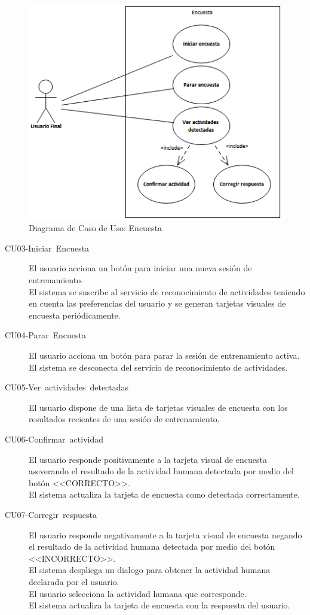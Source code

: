 \begin{figure}[H]
\begin{centering}
\includegraphics{capitulo-5/graphics/caso_encuesta}
\par\end{centering}
\caption[Diagrama de Caso de Uso: Encuesta]{\label{fig5:uc-encuesta}Diagrama de Caso de Uso: Encuesta}

\end{figure}

\begin{description}
\item [{CU03-Iniciar~Encuesta}] El usuario acciona un botón para iniciar
una nueva sesión de entrenamiento. \\
El sistema se suscribe al servicio de reconocimiento de actividades
teniendo en cuenta las preferencias del usuario y se generan tarjetas
visuales de encuesta periódicamente.
\item [{CU04-Parar~Encuesta}] El usuario acciona un botón para parar la
sesión de entrenamiento activa. \\
El sistema se desconecta del servicio de reconocimiento de actividades.
\item [{CU05-Ver~actividades~detectadas}] El usuario dispone de una lista
de tarjetas visuales de encuesta con los resultados recientes de una
sesión de entrenamiento. 
\item [{CU06-Confirmar~actividad}] El usuario responde positivamente a
la tarjeta visual de encuesta aseverando el resultado de la actividad
humana detectada por medio del botón <<CORRECTO>>. \\
El sistema actualiza la tarjeta de encuesta como detectada correctamente.
\item [{CU07-Corregir~respuesta}] El usuario responde negativamente a
la tarjeta visual de encuesta negando el resultado de la actividad
humana detectada por medio del botón <<INCORRECTO>>. \\
El sistema despliega un dialogo para obtener la actividad humana declarada
por el usuario.\\
El usuario selecciona la actividad humana que corresponde. \\
El sistema actualiza la tarjeta de encuesta con la respuesta del usuario.
\end{description}

